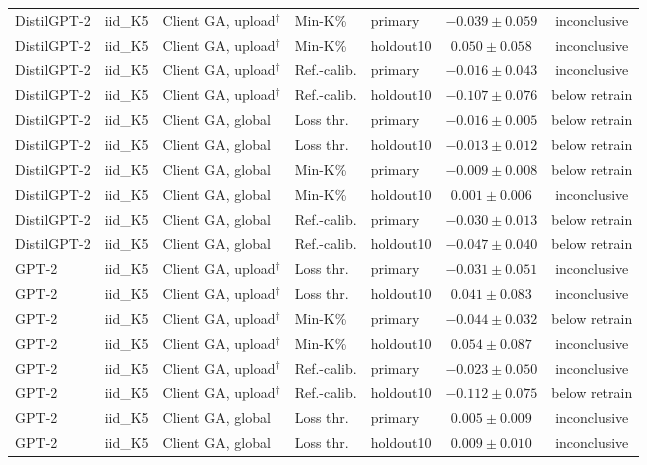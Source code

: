 \begin{table}[t]
\begin{tabular*}{\textwidth}{@{\extracolsep{\fill}}lllllcc@{}}
DistilGPT-2 & iid\_K5 & Client GA, upload$^{\dagger}$ & Min-K\% & primary & $-0.039 \pm 0.059$ & inconclusive \\
DistilGPT-2 & iid\_K5 & Client GA, upload$^{\dagger}$ & Min-K\% & holdout10 & $0.050 \pm 0.058$ & inconclusive \\
DistilGPT-2 & iid\_K5 & Client GA, upload$^{\dagger}$ & Ref.-calib. & primary & $-0.016 \pm 0.043$ & inconclusive \\
DistilGPT-2 & iid\_K5 & Client GA, upload$^{\dagger}$ & Ref.-calib. & holdout10 & $-0.107 \pm 0.076$ & below retrain \\
DistilGPT-2 & iid\_K5 & Client GA, global & Loss thr. & primary & $-0.016 \pm 0.005$ & below retrain \\
DistilGPT-2 & iid\_K5 & Client GA, global & Loss thr. & holdout10 & $-0.013 \pm 0.012$ & below retrain \\
DistilGPT-2 & iid\_K5 & Client GA, global & Min-K\% & primary & $-0.009 \pm 0.008$ & below retrain \\
DistilGPT-2 & iid\_K5 & Client GA, global & Min-K\% & holdout10 & $0.001 \pm 0.006$ & inconclusive \\
DistilGPT-2 & iid\_K5 & Client GA, global & Ref.-calib. & primary & $-0.030 \pm 0.013$ & below retrain \\
DistilGPT-2 & iid\_K5 & Client GA, global & Ref.-calib. & holdout10 & $-0.047 \pm 0.040$ & below retrain \\
GPT-2 & iid\_K5 & Client GA, upload$^{\dagger}$ & Loss thr. & primary & $-0.031 \pm 0.051$ & inconclusive \\
GPT-2 & iid\_K5 & Client GA, upload$^{\dagger}$ & Loss thr. & holdout10 & $0.041 \pm 0.083$ & inconclusive \\
GPT-2 & iid\_K5 & Client GA, upload$^{\dagger}$ & Min-K\% & primary & $-0.044 \pm 0.032$ & below retrain \\
GPT-2 & iid\_K5 & Client GA, upload$^{\dagger}$ & Min-K\% & holdout10 & $0.054 \pm 0.087$ & inconclusive \\
GPT-2 & iid\_K5 & Client GA, upload$^{\dagger}$ & Ref.-calib. & primary & $-0.023 \pm 0.050$ & inconclusive \\
GPT-2 & iid\_K5 & Client GA, upload$^{\dagger}$ & Ref.-calib. & holdout10 & $-0.112 \pm 0.075$ & below retrain \\
GPT-2 & iid\_K5 & Client GA, global & Loss thr. & primary & $0.005 \pm 0.009$ & inconclusive \\
GPT-2 & iid\_K5 & Client GA, global & Loss thr. & holdout10 & $0.009 \pm 0.010$ & inconclusive \\

\end{tabular*}
\end{table}
